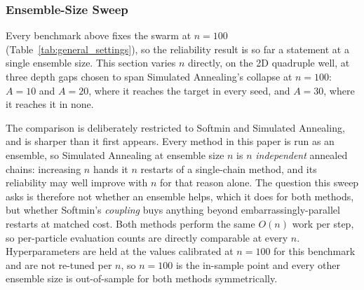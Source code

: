 \documentclass{article}
\theoremstyle{plain}
\theoremstyle{definition}
\theoremstyle{remark}
\begin{document}
\subsubsection{Ensemble-Size Sweep}
\label{apx:particle-sweep}

Every benchmark above fixes the swarm at $n=100$ (Table~\ref{tab:general_settings}), so the
reliability result is so far a statement at a single ensemble size. This section varies $n$
directly, on the 2D quadruple well, at three depth gaps chosen to span Simulated Annealing's
collapse at $n=100$: $A=10$ and $A=20$, where it reaches the target in every seed, and $A=30$,
where it reaches it in none.

The comparison is deliberately restricted to Softmin and Simulated Annealing, and is sharper than
it first appears. Every method in this paper is run as an ensemble, so Simulated Annealing at
ensemble size $n$ is $n$ \emph{independent} annealed chains: increasing $n$ hands it $n$ restarts
of a single-chain method, and its reliability may well improve with $n$ for that reason alone. The
question this sweep asks is therefore not whether an ensemble helps, which it does for both
methods, but whether Softmin's \emph{coupling} buys anything beyond embarrassingly-parallel
restarts at matched cost. Both methods perform the same $O(n)$ work per step, so per-particle
evaluation counts are directly comparable at every $n$. Hyperparameters are held at the values
calibrated at $n=100$ for this benchmark and are not re-tuned per $n$, so $n=100$ is the in-sample
point and every other ensemble size is out-of-sample for both methods symmetrically.
\end{document}
